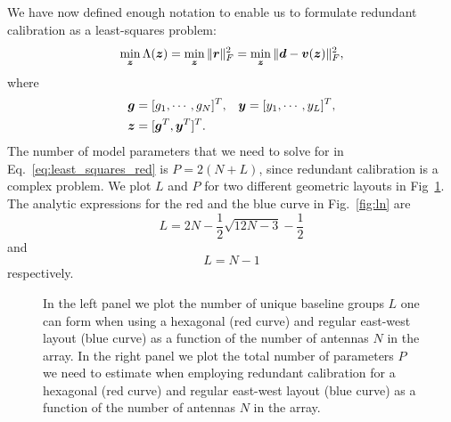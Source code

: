 \documentclass[useAMS,usenatbib]{mn2e}
\newcommand{\bz}{\bmath{z}}
\newcommand{\br}{\bmath{r}}
\newcommand{\bg}{\bmath{g}}
\newcommand{\bd}{\bmath{d}}
\newcommand{\bv}{\bmath{v}}
\newcommand{\by}{\bmath{y}}
\begin{document}
We have now defined enough notation to enable us to formulate redundant calibration as a least-squares problem:
\begin{equation}
\label{eq:least_squares_red}
\min_{\bz} \Lambda(\bz) = \min_{\bz} \|\br\|_F^2 = \min_{\bz} \|\bd - \bv(\bz)\|_F^2, 
\end{equation}
where
\begin{align}
 \bg &=[g_1,\cdots,g_N]^T, & \by &= [y_1,\cdots,y_L]^T,\nonumber\\
 \bz &= [\bg^T,\by^T]^T. &  &\label{eq:parm_definitions}
 \end{align}
The number of model parameters that we need to solve for in Eq.~\eqref{eq:least_squares_red} is $P = 2(N+L)$, since redundant calibration is a complex problem.
We plot $L$ and $P$ for two different geometric layouts in Fig~\ref{fig:pl}.
The analytic expressions for the red and the blue curve in Fig.~\ref{fig:ln} are \citep{Camps2003}
\begin{equation}
L = 2N-\frac{1}{2}\sqrt{12N-3}-\frac{1}{2} 
\end{equation}
and
\begin{equation}
L = N - 1 
\end{equation}
respectively.

\begin{figure}
\centering
{}
\caption{In the left panel we plot the number of unique baseline groups $L$ one can form when using a hexagonal (red curve) and regular east-west layout (blue curve) as 
a function of the number of antennas $N$ in the array. In the right panel we plot the total number of parameters $P$ we need to estimate when employing redundant calibration for a hexagonal (red curve) and regular east-west layout (blue curve) as 
a function of the number of antennas $N$ in the array. 
\label{fig:pl}} 
\end{figure}
\end{document}
